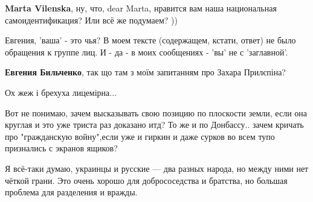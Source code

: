 \begin{itemize}
\textbf{Marta Vilenska}, ну, что, dear Marta, нравится вам наша национальная самоидентификация? Или всё же подумаем? ))

\begin{itemize}
 
Евгения, 'ваша' - это чья? В моем тексте (содержащем, кстати, ответ) не было обращения к группе лиц. И - да - в моих сообщениях - 'вы' не с 'заглавной'.
\end{itemize}

 
\textbf{Евгения Бильченко}, так що там з моїм запитанням про Захара Прилєпіна?

 
Ох жеж і брехуха лицемірна...

 

Вот не понимаю, зачем высказывать свою позицию по плоскости земли, если она
круглая и это уже триста раз доказано итд? То же и по Донбассу.. зачем кричать
про "гражданскую войну",если уже и гиркин и даже сурков во всем тупо признались
с экранов ящиков?

 

Я всё-таки думаю, украинцы и русские — два разных народа, но между ними нет
чёткой грани. Это очень хорошо для добрососедства и братства, но большая
проблема для разделения и вражды.


\end{itemize}
